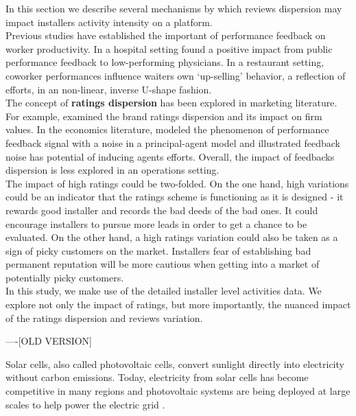 \documentclass[msom,blindrev]{informs3}
\begin{document}
 In this section we describe several mechanisms by which reviews dispersion may impact installers activity intensity on a platform. \\
 Previous studies have established the important of performance feedback on worker productivity. In a hospital setting \cite{song2017closing} found a positive impact from public performance feedback to low-performing physicians. In a restaurant setting, coworker performances influence waiters own `up-selling' behavior, a reflection of efforts, in an non-linear, inverse U-shape fashion. \\
The concept of \textbf{ratings dispersion} has been explored in marketing literature. For example, \cite{luo2013impact} examined the brand ratings dispersion and its impact on firm values. In the economics literature, \cite{marinovic2015credibility} modeled the phenomenon of performance feedback signal with a noise in a principal-agent model and illustrated feedback noise has potential of inducing agents efforts. Overall, the impact of feedbacks dispersion is less explored in an operations setting. \\
The impact of high ratings could be two-folded. On the one hand, high variations could be an indicator that the ratings scheme is functioning as it is designed - it rewards good installer and records the bad deeds of the bad ones. It could encourage installers to pursue more leads in order to get a chance to be evaluated.
On the other hand, a high ratings variation could also be taken as a sign of picky customers on the market. Installers fear of establishing bad permanent reputation will be more cautious when getting into a market of potentially picky customers. \\
In this study, we make use of the detailed installer level activities data. We explore not only the impact of ratings, but more importantly, the nuanced impact of the ratings dispersion and reviews variation.


----[OLD VERSION]

Solar cells, also called photovoltaic cells, convert sunlight directly into electricity without carbon emissions. Today, electricity from solar cells has become competitive in many regions and photovoltaic systems are being deployed at large scales to help power the electric grid \citep{nrel.gov}.
\end{document}
